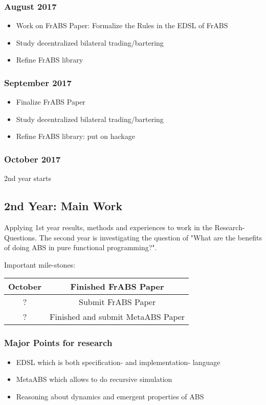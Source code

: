 \subsubsection{August 2017}
\begin{itemize}
	\item Work on FrABS Paper: Formalize the Rules in the EDSL of FrABS
	\item Study decentralized bilateral trading/bartering
	\item Refine FrABS library
\end{itemize}

\subsubsection{September 2017}
\begin{itemize}
	\item Finalize FrABS Paper
	\item Study decentralized bilateral trading/bartering
	\item Refine FrABS library: put on hackage
\end{itemize}

\subsubsection{October 2017}
2nd year starts




\subsection{2nd Year: Main Work}
Applying 1st year results, methods and experiences to work in the Research-Questions. The second year is investigating the question of "What are the benefits of doing ABS in pure functional programming?".

Important mile-stones:

\begin{center}
\begin{tabular}{ c | c } 
	October & Finished FrABS Paper \\
	\hline
	? & Submit FrABS Paper \\
	\hline
	? & Finished and submit MetaABS Paper \\
\end{tabular}
\end{center}

\subsubsection{Major Points for research}
\begin{itemize}
	\item EDSL which is both specification- and implementation- language
	\item MetaABS which allows to do recursive simulation
	\item Reasoning about dynamics and emergent properties of ABS
\end{itemize}

